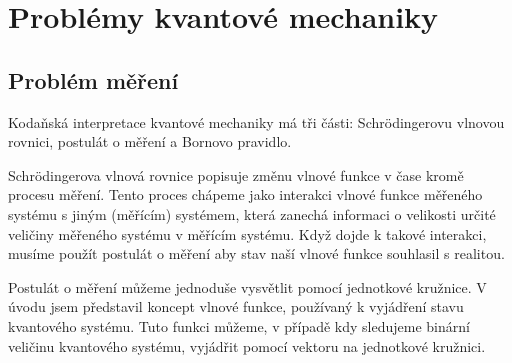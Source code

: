 \section{Problémy kvantové mechaniky}
    \subsection{Problém měření}
Kodaňská interpretace kvantové mechaniky má tři části: Schrödingerovu vlnovou rovnici, postulát o měření a Bornovo pravidlo.

Schrödingerova vlnová rovnice popisuje změnu vlnové funkce v čase kromě procesu měření. Tento proces chápeme jako interakci vlnové funkce měřeného systému s jiným (měřícím) systé\-mem, která zanechá informaci o velikosti určité veličiny měřeného systému v měřícím systému. Když dojde k takové interakci, musíme použít postulát o měření aby stav naší vlnové funkce souhlasil s realitou.

Postulát o měření můžeme jednoduše vysvětlit pomocí jednotkové kružnice. V úvodu jsem představil koncept vlnové funkce, používaný k vyjádření stavu kvantového systému. Tuto funkci můžeme, v případě kdy sledujeme binární veličinu kvantového systému, vyjádřit pomocí vektoru na jednotkové kružnici. 



\begin{figure}[h]

    \centering

    \caption{\label{fig:3}}
\end{figure}